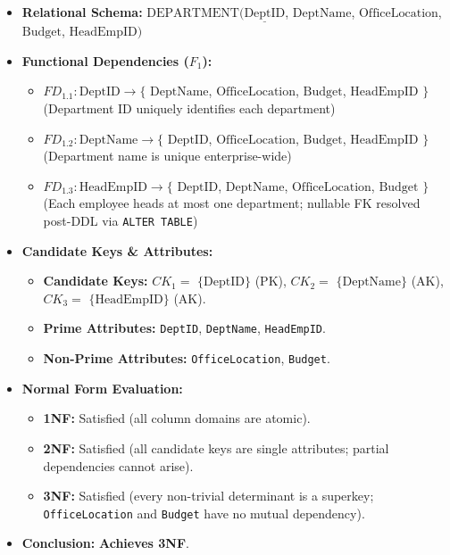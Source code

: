 \documentclass[a4paper,12pt]{report}
\begin{document}
\begin{itemize}
\item
  \textbf{Relational Schema:} \(\text{DEPARTMENT}(\underline{\text{DeptID}}\), \(\text{DeptName}\), \(\text{OfficeLocation}\), \(\text{Budget}\), \(\text{HeadEmpID})\)
\item
  \textbf{Functional Dependencies (\(F_{1}\)):}

  \begin{itemize}
  \item
    \(FD_{1.1}: \text{DeptID} \rightarrow \{\) \(\text{DeptName}\), \(\text{OfficeLocation}\), \(\text{Budget}\), \(\text{HeadEmpID}\) \(\}\) (Department ID uniquely identifies each department)
  \item
    \(FD_{1.2}: \text{DeptName} \rightarrow \{\) \(\text{DeptID}\), \(\text{OfficeLocation}\), \(\text{Budget}\), \(\text{HeadEmpID}\) \(\}\) (Department name is unique enterprise-wide)
  \item
    \(FD_{1.3}: \text{HeadEmpID} \rightarrow \{\) \(\text{DeptID}\), \(\text{DeptName}\), \(\text{OfficeLocation}\), \(\text{Budget}\) \(\}\) (Each employee heads at most one department; nullable FK resolved post-DDL via \texttt{ALTER TABLE})
  \end{itemize}
\item
  \textbf{Candidate Keys \& Attributes:}

  \begin{itemize}
  \item
    \textbf{Candidate Keys:} \(CK_{1} =\) \(\{\text{DeptID}\}\) (PK), \(CK_{2} =\) \(\{\text{DeptName}\}\) (AK), \(CK_{3} =\) \(\{\text{HeadEmpID}\}\) (AK).
  \item
    \textbf{Prime Attributes:} \texttt{DeptID}, \texttt{DeptName}, \texttt{HeadEmpID}.
  \item
    \textbf{Non-Prime Attributes:} \texttt{OfficeLocation}, \texttt{Budget}.
  \end{itemize}
\item
  \textbf{Normal Form Evaluation:}

  \begin{itemize}
  \item
    \textbf{1NF:} Satisfied (all column domains are atomic).
  \item
    \textbf{2NF:} Satisfied (all candidate keys are single attributes; partial dependencies cannot arise).
  \item
    \textbf{3NF:} Satisfied (every non-trivial determinant is a superkey; \texttt{OfficeLocation} and \texttt{Budget} have no mutual dependency).
  \end{itemize}
\item
  \textbf{Conclusion:} \textbf{Achieves 3NF}.
\end{itemize}
\end{document}
